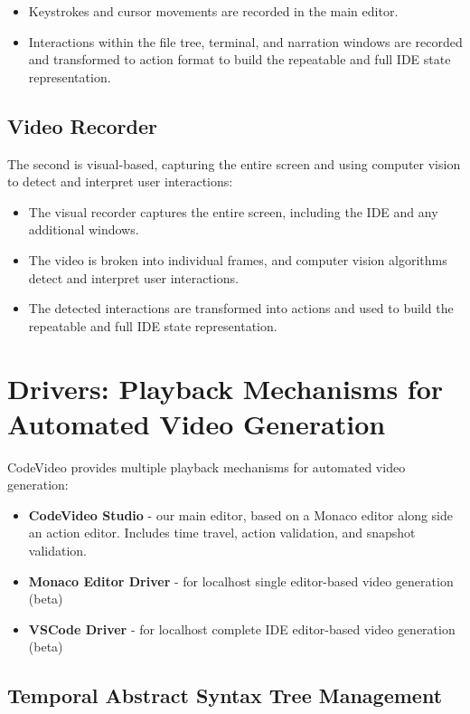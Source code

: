 \documentclass[11pt, a4paper]{article}
\begin{document}
\begin{itemize}
    \item Keystrokes and cursor movements are recorded in the main editor.
    \item Interactions within the file tree, terminal, and narration windows are recorded and transformed to action format to build the repeatable and full IDE state representation.
\end{itemize}

\subsection{Video Recorder}

The second is visual-based, capturing the entire screen and using computer vision to detect and interpret user interactions:

\begin{itemize}
    \item The visual recorder captures the entire screen, including the IDE and any additional windows.
    \item The video is broken into individual frames, and computer vision algorithms detect and interpret user interactions.
    \item The detected interactions are transformed into actions and used to build the repeatable and full IDE state representation.
\end{itemize}

\section{Drivers: Playback Mechanisms for Automated Video Generation}

CodeVideo provides multiple playback mechanisms for automated video generation:

\begin{itemize}
    \item \textbf{CodeVideo Studio} - our main editor, based on a Monaco editor along side an action editor. Includes time travel, action validation, and snapshot validation.
    \item \textbf{Monaco Editor Driver} - for localhost single editor-based video generation (beta)
    \item \textbf{VSCode Driver} - for localhost complete IDE editor-based video generation (beta)
\end{itemize}

\subsection{Temporal Abstract Syntax Tree Management}
\end{document}
